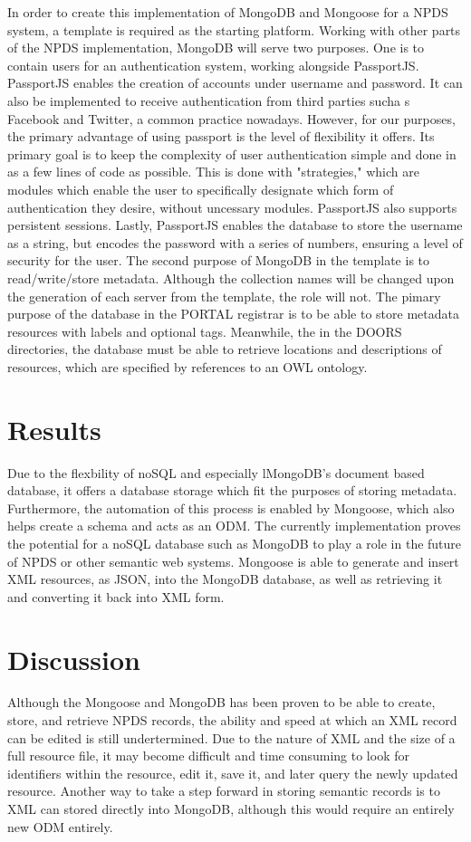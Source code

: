 \documentclass[10pt,twocolumn,twoside]{article}
\begin{document}
	In order to create this implementation of MongoDB and Mongoose for a NPDS system, a template is required as the starting platform. Working with other parts of the NPDS implementation, MongoDB will serve two purposes. One is to contain users for an authentication system, working alongside PassportJS. PassportJS enables the creation of accounts under username and password. It can also be implemented to receive authentication from third parties sucha s Facebook and Twitter, a common practice nowadays. However, for our purposes, the primary advantage of using passport is the level of flexibility it offers. Its primary goal is to keep the complexity of user authentication simple and done in as a few lines of code as possible. This is done with "strategies," which are modules which enable the user to specifically designate which form of authentication they desire, without uncessary modules. PassportJS also supports persistent sessions. Lastly, PassportJS enables the database to store the username as a string, but encodes the password with a series of numbers, ensuring a level of security for the user. The second purpose of MongoDB in the template is to read/write/store metadata. Although the collection names will be changed upon the generation of each server from the template, the role will not. The pimary purpose of the database in the PORTAL registrar is to be able to store metadata resources with labels and optional tags. Meanwhile, the in the DOORS directories, the database must be able to retrieve locations and descriptions of resources, which are specified by references to an OWL ontology.

\section*{Results}
	Due to the flexbility of noSQL and especially lMongoDB's document based database, it offers a database storage which fit the purposes of storing metadata. Furthermore, the automation of this process is enabled by Mongoose, which also helps create a schema and acts as an ODM. The currently implementation proves the potential for a noSQL database such as MongoDB to play a role in the future of NPDS or other semantic web systems.  Mongoose is able to generate and insert XML resources, as JSON, into the MongoDB database, as well as retrieving it and converting it back into XML form. 


\section*{Discussion}
	Although the Mongoose and MongoDB has been proven to be able to create, store, and retrieve NPDS records, the ability and speed at which an XML record can be edited is still undertermined. Due to the nature of XML and the size of a full resource file, it may become difficult and time consuming to look for identifiers within the resource, edit it, save it, and later query the newly updated resource. Another way to take a step forward in storing semantic records is to XML can stored directly into MongoDB, although this would require an entirely new ODM entirely. 
\end{document}

